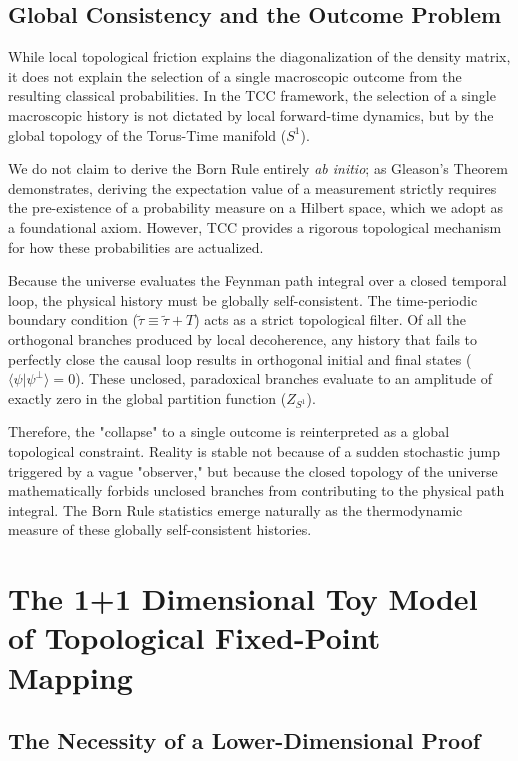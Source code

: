 \documentclass[12pt,openany]{book}
\theoremstyle{plain}
\theoremstyle{definition}
\theoremstyle{remark}
\begin{document}
\section{Global Consistency and the Outcome Problem}
While local topological friction explains the diagonalization of the density matrix, it does not explain the selection of a single macroscopic outcome from the resulting classical probabilities. In the TCC framework, the selection of a single macroscopic history is not dictated by local forward-time dynamics, but by the global topology of the Torus-Time manifold ($S^1$).

We do not claim to derive the Born Rule entirely \textit{ab initio}; as Gleason's Theorem demonstrates, deriving the expectation value of a measurement strictly requires the pre-existence of a probability measure on a Hilbert space, which we adopt as a foundational axiom. However, TCC provides a rigorous topological mechanism for how these probabilities are actualized.

Because the universe evaluates the Feynman path integral over a closed temporal loop, the physical history must be globally self-consistent. The time-periodic boundary condition ($\tilde{\tau} \equiv \tilde{\tau} + T$) acts as a strict topological filter. Of all the orthogonal branches produced by local decoherence, any history that fails to perfectly close the causal loop results in orthogonal initial and final states ($\langle \psi | \psi^\perp \rangle = 0$). These unclosed, paradoxical branches evaluate to an amplitude of exactly zero in the global partition function ($Z_{S^1}$).

Therefore, the "collapse" to a single outcome is reinterpreted as a global topological constraint. Reality is stable not because of a sudden stochastic jump triggered by a vague "observer," but because the closed topology of the universe mathematically forbids unclosed branches from contributing to the physical path integral. The Born Rule statistics emerge naturally as the thermodynamic measure of these globally self-consistent histories.

\chapter{The 1+1 Dimensional Toy Model of Topological Fixed-Point Mapping}

\section{The Necessity of a Lower-Dimensional Proof}
\end{document}

